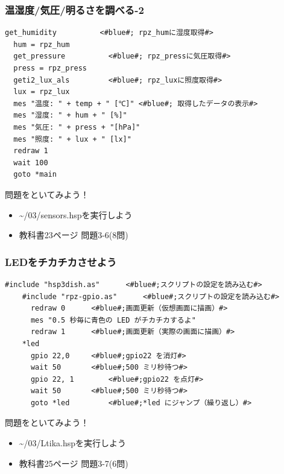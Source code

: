 \begin{frame}[fragile]
  \frametitle{温湿度/気圧/明るさを調べる-2}
  \begin{lstlisting}[title=\sim/03/sensors.hsp 後半, label=sensors.hsp-2]
  get_humidity          <#blue#; rpz_humに湿度取得#>
  hum = rpz_hum       
  get_pressure          <#blue#; rpz_pressに気圧取得#>
  press = rpz_press
  geti2_lux_als         <#blue#; rpz_luxに照度取得#>
  lux = rpz_lux
  mes "温度: " + temp + " [℃]" <#blue#; 取得したデータの表示#>
  mes "湿度: " + hum + " [%]"
  mes "気圧: " + press + "[hPa]"
  mes "照度: " + lux + " [lx]"
  redraw 1              
  wait 100
  goto *main
  \end{lstlisting}
\end{frame}

\begin{frame}
  \begin{exampleblock}{問題をといてみよう！}
    \begin{itemize}
      \item \sim/03/sensors.hspを実行しよう
      \item 教科書23ページ 問題3-6(8問)
    \end{itemize}
  \end{exampleblock} 
\end{frame}


\begin{frame}[fragile]
  \frametitle{LEDをチカチカさせよう}
  \begin{lstlisting}[title=\sim/03/Ltika.hsp,label=Ltika.hsp]
    #include "hsp3dish.as"		<#blue#;スクリプトの設定を読み込む#>
    #include "rpz-gpio.as"		<#blue#;スクリプトの設定を読み込む#>
      redraw 0		<#blue#;画面更新（仮想画面に描画）#>
      mes "0.5 秒毎に青色の LED がチカチカするよ"
      redraw 1		<#blue#;画面更新（実際の画面に描画）#>
    *led
      gpio 22,0		<#blue#;gpio22 を消灯#>
      wait 50 		<#blue#;500 ミリ秒待つ#>
      gpio 22, 1 		<#blue#;gpio22 を点灯#>
      wait 50 		<#blue#;500 ミリ秒待つ#>
      goto *led 		<#blue#;*led にジャンプ（繰り返し）#>
  \end{lstlisting}
\end{frame}

\begin{frame}
  \begin{exampleblock}{問題をといてみよう！}
    \begin{itemize}
      \item \sim/03/Ltika.hspを実行しよう
      \item 教科書25ページ 問題3-7(6問)
    \end{itemize}
  \end{exampleblock} 
\end{frame}

